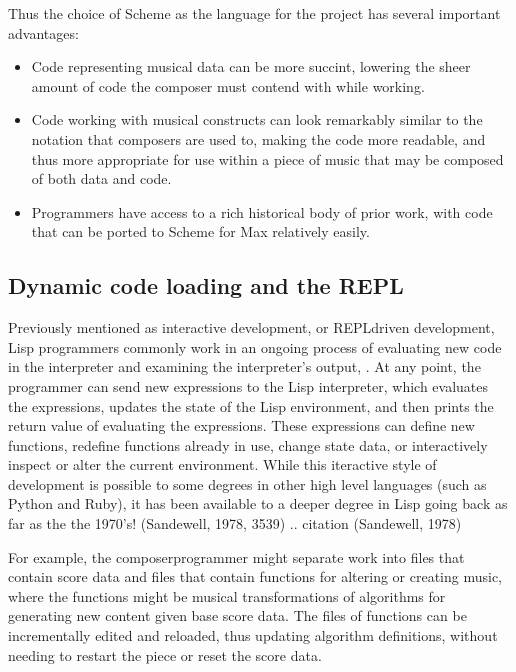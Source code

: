 \documentclass[letterpaper,10pt,english]{sphinxmanual}
\begin{document}
\sphinxAtStartPar
Thus the choice of Scheme as the language for the project has several important advantages:
\begin{itemize}
\item {} 
\sphinxAtStartPar
Code representing musical data can be more succint, lowering the sheer amount of code the composer must contend with while working.

\item {} 
\sphinxAtStartPar
Code working with musical constructs can look remarkably similar to the notation that composers are used to, making the code
more readable, and thus more appropriate for use within a piece of music that may be composed of both data and code.

\item {} 
\sphinxAtStartPar
Programmers have access to a rich historical body of prior work, with code that can be ported to Scheme for Max relatively easily.

\end{itemize}


\subsection{Dynamic code loading and the REPL}
\label{\detokenize{design:dynamic-code-loading-and-the-repl}}
\sphinxAtStartPar
Previously mentioned as interactive development, or REPL\sphinxhyphen{}driven development, Lisp programmers commonly work in an ongoing process
of evaluating new code in the interpreter and examining the interpreter’s output, .
At any point, the programmer can send new expressions to the Lisp interpreter, which evaluates the expressions, updates
the state of the Lisp environment, and then prints the return value of evaluating the expressions.
These expressions can define new functions, redefine functions already in use, change state data, or
interactively inspect or alter the current environment. While this iteractive style of development is possible
to some degrees in other high level languages (such as Python and Ruby), it has been available to a deeper degree in Lisp going
back as far as the the 1970’s! (Sandewell, 1978, 35\sphinxhyphen{}39)
.. citation (Sandewell, 1978)

\sphinxAtStartPar
For example, the composer\sphinxhyphen{}programmer might separate work into files that contain score data and files
that contain functions for altering or creating music, where the functions might be musical transformations of
algorithms for generating new content given base score data.
The files of functions can be incrementally edited and reloaded, thus updating algorithm definitions, without needing
to restart the piece or reset the score data.
\end{document}
